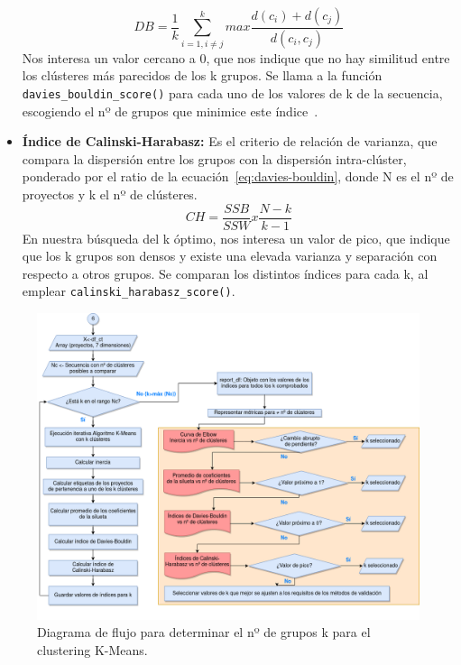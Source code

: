 \documentclass[a4paper, 12pt]{book}
\begin{document}
\begin{itemize}
    \begin{equation}
        DB=\frac{1}{k}\sum \limits _{i=1,i\neq j}^{k} max\frac{d(c_i)+d(c_j)}{d(c_i ,c_j)}
    \label{eq:davies-bouldin}
    \end{equation} 
    Nos interesa un valor cercano a 0, que nos indique que no hay similitud entre los clústeres más parecidos de los k grupos. Se llama a la función \texttt{davies\_bouldin\_score()} para cada uno de los valores de k de la secuencia, escogiendo el nº de grupos que minimice este índice~\cite{davies1979cluster}.
    \item \textbf{Índice de Calinski-Harabasz:} Es el criterio de relación de varianza, que compara la dispersión entre los grupos con la dispersión intra-clúster, ponderado por el ratio de la ecuación~\eqref{eq:davies-bouldin}, donde N es el nº de proyectos y k el nº de clústeres.
    \begin{equation}
        CH=\frac{SSB}{SSW}x\frac{N-k}{k-1}
        \label{eq:ch}
    \end{equation} 
    En nuestra búsqueda del k óptimo, nos interesa un valor de pico, que indique que los k grupos son densos y existe una elevada varianza y separación con respecto a otros grupos. Se comparan los distintos índices para cada k, al emplear \texttt{calinski\_harabasz\_score()}.	
\end{itemize}

\begin{figure}[H]
    \centering
    \includegraphics[height=.5\textheight]{img/kmeans_diseno.png}
    \caption{Diagrama de flujo para determinar el nº de grupos k para el clustering K-Means.}\label{fig:kmeans}
\end{figure}
\end{document}
